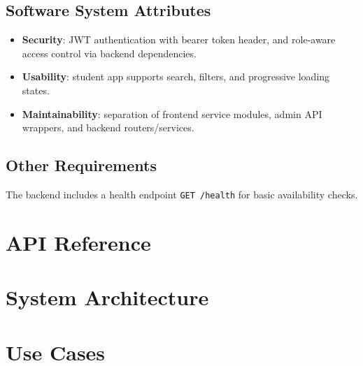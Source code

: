 \documentclass[11pt]{article}
\begin{document}
\subsection{Software System Attributes}
\begin{itemize}[nosep]
  \item \textbf{Security}: JWT authentication with bearer token header, and role-aware access control via backend dependencies.
  \item \textbf{Usability}: student app supports search, filters, and progressive loading states.
  \item \textbf{Maintainability}: separation of frontend service modules, admin API wrappers, and backend routers/services.
\end{itemize}

\subsection{Other Requirements}
The backend includes a health endpoint \texttt{GET /health} for basic availability checks.

\section{API Reference}
\label{sec:api-reference}


\section{System Architecture}
\label{sec:architecture}


\section{Use Cases}
\label{sec:usecases}




\end{document}

